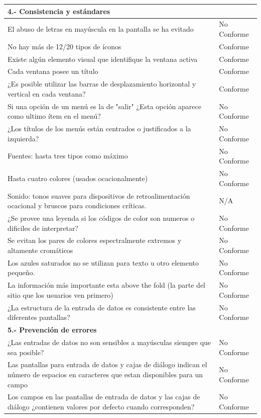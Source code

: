 \documentclass[stu, 12pt, letterpaper, donotrepeattitle, floatsintext, natbib]{apa7}
\begin{document}
\begin{longtable}{|>{\raggedright\arraybackslash}p{10cm}|>{\centering\arraybackslash}p{3cm}|}
    \textbf{4.- Consistencia y estándares} & \\ \hline
    El abuso de letras en mayúscula en la pantalla se ha evitado & No Conforme \\ \hline
    No hay más de 12/20 tipos de íconos & Conforme \\ \hline
    Existe algún elemento visual que identifique la ventana activa & Conforme \\ \hline
    Cada ventana posee un título & Conforme \\ \hline
    ¿Es posible utilizar las barras de desplazamiento horizontal y vertical en cada ventana? & Conforme \\ \hline
    Si una opción de un menú es la de "salir" ¿Esta opción aparece como ultimo ítem en el menú? & No Conforme \\ \hline
    ¿Los títulos de los menús están centrados o justificados a la izquierda? & No Conforme\\ \hline
    Fuentes: hasta tres tipos como máximo & No Conforme\\ \hline
    Hasta cuatro colores (usados ocacionalmente)  & No Conforme \\ \hline
    Sonido: tonos suaves para dispositivos de retroalimentación ocacional y bruscos para condiciones críticas. & N/A\\ \hline
    ¿Se provee una leyenda si los códigos de color son numeros o dificiles de interpretar?  & No Conforme \\ \hline
    Se evitan los pares de colores espectralmente extremos y altamente  cromáticos & No Conforme \\ \hline
    Los azules saturados no se utilizan para texto u otro elemento pequeño. & No Conforme \\ \hline
    La información más importante esta above the fold (la parte del sitio que los usuarios ven primero) & No Conforme \\ \hline
    ¿La estructura de la entrada de datos es consistente entre las diferentes pantallas? & No Conforme \\ \hline

    \textbf{5.- Prevención de errores} & \\ \hline
    ¿Las entradas de datos no son sensibles a mayúsculas siempre que sea posible? & No Conforme \\ \hline
    Las pantallas para entrada de datos y cajas de diálogo indican el número de espacios en caracteres que estan disponibles para un campo & No Conforme \\ \hline
    Los campos en las pantallas de entrada de datos y las cajas de diálogo ¿contienen valores por defecto cuando corresponden? & No Conforme \\ \hline


\end{longtable}
\end{document}
